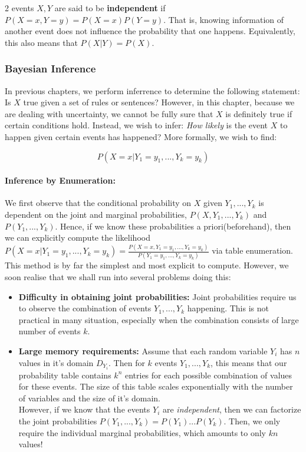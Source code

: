 \documentclass[12pt]{article}
\begin{document}
2 events $X, Y$ are said to be \textbf{independent} if $P(X = x, Y= y) = P(X = x) P(Y =y )$. That is, knowing information of another event does not influence the probability that one happens. Equivalently, this also means that $P(X|Y) = P(X)$. 
 
\subsubsection{Bayesian Inference}
 
In previous chapters, we perform inferrence to determine the following statement: Is $X$ true given a set of rules or sentences? However, in this chapter, because we are dealing with uncertainty, we cannot be fully sure that $X$ is definitely true if certain conditions hold. Instead, we wish to infer: \textit{How likely} is the event $X$ to happen given certain events has happened? More formally, we wish to find:

\begin{equation*}
P(X=x|Y_1 = y_1, ..., Y_k = y_k)
\end{equation*}

\paragraph{Inference by Enumeration:} We first observe that the conditional probability on $X$ given $Y_1,..., Y_k$ is dependent on the joint and marginal probabilities, $P(X, Y_1,..., Y_k)$ and $P(Y_1,...,Y_k)$. Hence, if we know these probabilities a priori(beforehand), then we can explicitly compute the likelihood $P(X=x|Y_1 = y_1, ..., Y_k = y_k) = \frac{P(X = x, Y_1 = y_1, ..., Y_k = y_k)}{P(Y_1 = y_1, ..., Y_k = y_k)}$ via table enumeration. \\

This method is by far the simplest and most explicit to compute. However, we soon realise that we shall run into several problems doing this:

\begin{itemize}
\item \textbf{Difficulty in obtaining joint probabilities:} Joint probabilities require us to observe the combination of events $Y_1,...,Y_k$ happening. This is not practical in many situation, especially when the combination consists of large number of events $k$.

\item \textbf{Large memory requirements:} Assume that each random variable $Y_i$ has $n$ values in it's domain $D_{Y_i}$. Then for $k$ events $Y_1,..., Y_k$, this means that our probability table contains $k^n$ entries for each possible combination of values for these events. The size of this table scales exponentially with the number of variables and the size of it's domain. \\

However, if we know that the events $Y_i$ are \textit{independent}, then we can factorize the joint probabilities $P(Y_1,...,Y_k) = P(Y_1)...P(Y_k)$. Then, we only require the individual marginal probabilities, which amounts to only $kn$ values!
\end{itemize}
\end{document}
